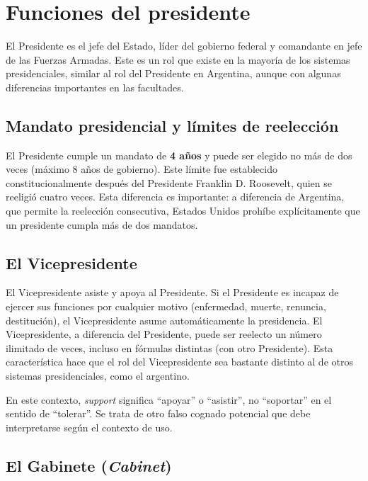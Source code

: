 \documentclass[12pt,oneside]{book}
\begin{document}
\section{Funciones del presidente}

El Presidente es el jefe del Estado, líder del gobierno federal y comandante en jefe de las Fuerzas Armadas. Este es un rol que existe en la mayoría de los sistemas presidenciales, similar al rol del Presidente en Argentina, aunque con algunas diferencias importantes en las facultades.

\subsection{Mandato presidencial y límites de reelección}

El Presidente cumple un mandato de \textbf{4 años} y puede ser elegido no más de dos veces (máximo 8 años de gobierno). Este límite fue establecido constitucionalmente después del Presidente Franklin D. Roosevelt, quien se reeligió cuatro veces. Esta diferencia es importante: a diferencia de Argentina, que permite la reelección consecutiva, Estados Unidos prohíbe explícitamente que un presidente cumpla más de dos mandatos.

\subsection{El Vicepresidente}

El Vicepresidente asiste y apoya al Presidente. Si el Presidente es incapaz de ejercer sus funciones por cualquier motivo (enfermedad, muerte, renuncia, destitución), el Vicepresidente asume automáticamente la presidencia. El Vicepresidente, a diferencia del Presidente, puede ser reelecto un número ilimitado de veces, incluso en fórmulas distintas (con otro Presidente). Esta característica hace que el rol del Vicepresidente sea bastante distinto al de otros sistemas presidenciales, como el argentino.

\begin{note}
En este contexto, \textit{support} significa ``apoyar'' o ``asistir'', no ``soportar'' en el sentido de ``tolerar''. Se trata de otro falso cognado potencial que debe interpretarse según el contexto de uso.
\end{note}

\subsection{El Gabinete (\textit{Cabinet})}
\end{document}
